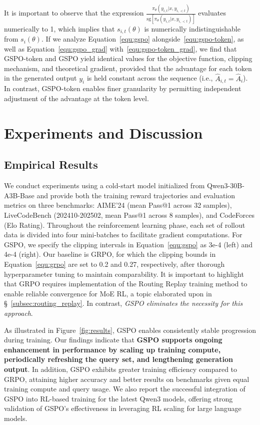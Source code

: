 It is important to observe that the expression $\frac{ \pi_{\theta} (y_{i,t} | x, y_{i,<t}) }{ \mathrm{sg} \left[ \pi_{\theta} (y_{i,t} | x, y_{i,<t}) \right] }$ evaluates numerically to 1, which implies that $s_{i,t}(\theta)$ is numerically indistinguishable from $s_{i}(\theta)$. If we analyze Equation~\eqref{equ:gspo} alongside~\eqref{equ:gspo-token}, as well as Equation~\eqref{equ:gspo_grad} with~\eqref{equ:gspo-token_grad}, we find that GSPO-token and GSPO yield identical values for the objective function, clipping mechanism, and theoretical gradient, provided that the advantage for each token in the generated output $y_i$ is held constant across the sequence (i.e., $\widehat{A}_{i,t} = \widehat{A}_{i}$). In contrast, GSPO-token enables finer granularity by permitting independent adjustment of the advantage at the token level.

\section{Experiments and Discussion}

\subsection{Empirical Results}

We conduct experiments using a cold-start model initialized from Qwen3-30B-A3B-Base and provide both the training reward trajectories and evaluation metrics on three benchmarks: AIME'24 (mean Pass@1 across 32 samples), LiveCodeBench (202410-202502, mean Pass@1 across 8 samples), and CodeForces (Elo Rating). Throughout the reinforcement learning phase, each set of rollout data is divided into four mini-batches to facilitate gradient computations. For GSPO, we specify the clipping intervals in Equation~\eqref{equ:gspo} as 3e-4 (left) and 4e-4 (right). Our baseline is GRPO, for which the clipping bounds in Equation~\eqref{equ:grpo} are set to 0.2 and 0.27, respectively, after thorough hyperparameter tuning to maintain comparability. It is important to highlight that GRPO requires implementation of the Routing Replay training method to enable reliable convergence for MoE RL, a topic elaborated upon in \S~\ref{subsec:routing_replay}. In contrast, \textit{GSPO eliminates the necessity for this approach}.

As illustrated in Figure~\ref{fig:results}, GSPO enables consistently stable progression during training. Our findings indicate that \textbf{GSPO supports ongoing enhancement in performance by scaling up training compute, periodically refreshing the query set, and lengthening generation output}. In addition, GSPO exhibits greater training efficiency compared to GRPO, attaining higher accuracy and better results on benchmarks given equal training compute and query usage. We also report the successful integration of GSPO into RL-based training for the latest Qwen3 models, offering strong validation of GSPO’s effectiveness in leveraging RL scaling for large language models.


